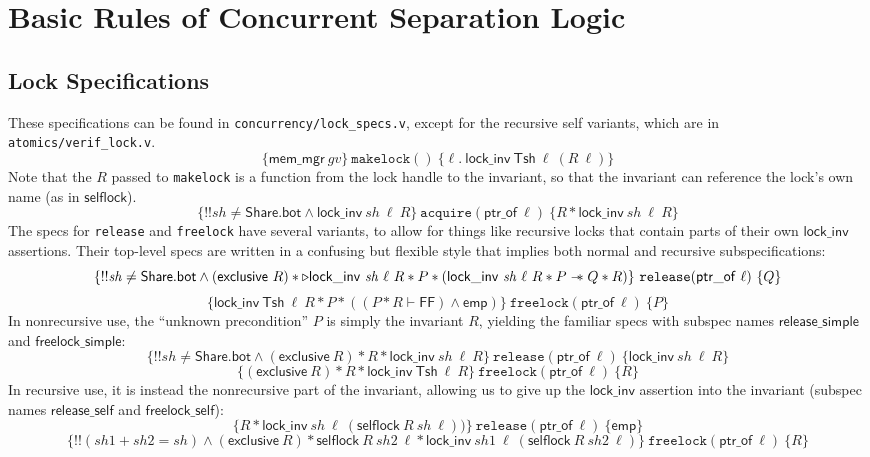 \documentclass[11pt]{article}
\begin{document}
\section{Basic Rules of Concurrent Separation Logic}
\label{CSL}
\subsection{Lock Specifications}
\label{lock-specs}
These specifications can be found in \texttt{concurrency/lock\_specs.v}, except for the recursive \textsf{self} variants, which are in \texttt{atomics/verif\_lock.v}.
$$\{\mathsf{mem\_mgr}\ \mathit{gv}\}\ \texttt{makelock}()\ \{\ell.\ \mathsf{lock\_inv}\ \mathsf{Tsh}\ \ell\ (R\ \ell)\}$$
Note that the $R$ passed to \texttt{makelock} is a function from the lock handle to the invariant, so that the invariant can reference the lock's own name (as in $\mathsf{selflock}$).
$$\{!!\mathit{sh} \neq \mathsf{Share.bot} \land \mathsf{lock\_inv}\ \mathit{sh}\ \ell\ R\}\ \texttt{acquire}(\mathsf{ptr\_of}\ \ell)\ \{R * \mathsf{lock\_inv}\ \mathit{sh}\ \ell\ R\}$$
The specs for \texttt{release} and \texttt{freelock} have several variants, to allow for things like recursive locks that contain parts of their own $\mathsf{lock\_inv}$ assertions. Their top-level specs are written in a confusing but flexible style that implies both normal and recursive subspecifications:
$$\{!!\mathit{sh} \neq \mathsf{Share.bot} \land (\mathsf{exclusive}\ R) * \triangleright \mathsf{lock\_inv}\ \mathit{sh}\ \ell\ R * P * (\mathsf{lock\_inv}\ \mathit{sh}\ \ell\ R * P \wand Q * R)\}\ \texttt{release}(\mathsf{ptr\_of}\ \ell)\ \{Q\}$$
$$\{\mathsf{lock\_inv}\ \mathsf{Tsh}\ \ell\ R * P * ((P * R \vdash \mathsf{FF}) \land \mathsf{emp})\}\ \texttt{freelock}(\mathsf{ptr\_of}\ \ell)\ \{P\}$$
In nonrecursive use, the ``unknown precondition'' $P$ is simply the invariant $R$, yielding the familiar specs with subspec names $\mathsf{release\_simple}$ and $\mathsf{freelock\_simple}$:
$$\{!!\mathit{sh} \neq \mathsf{Share.bot} \land (\mathsf{exclusive}\ R) * R * \mathsf{lock\_inv}\ \mathit{sh}\ \ell\ R\}\ \texttt{release}(\mathsf{ptr\_of}\ \ell)\ \{\mathsf{lock\_inv}\ \mathit{sh}\ \ell\ R\}$$
$$\{(\mathsf{exclusive}\ R) * R * \mathsf{lock\_inv}\ \mathsf{Tsh}\ \ell\ R\}\ \texttt{freelock}(\mathsf{ptr\_of}\ \ell)\ \{R\}$$
In recursive use, it is instead the nonrecursive part of the invariant, allowing us to give up the $\mathsf{lock\_inv}$ assertion into the invariant (subspec names $\mathsf{release\_self}$ and $\mathsf{freelock\_self}$):
$$\{R * \mathsf{lock\_inv}\ \mathit{sh}\ \ell\ (\mathsf{selflock}\ R\ \mathit{sh}\ \ell))\}\ \texttt{release}(\mathsf{ptr\_of}\ \ell)\ \{\mathsf{emp}\}$$
$$\{!!(\mathit{sh1} + \mathit{sh2} = \mathit{sh}) \land (\mathsf{exclusive}\ R) * \mathsf{selflock}\ R\ \mathit{sh2}\ \ell * \mathsf{lock\_inv}\ \mathit{sh1}\ \ell\ (\mathsf{selflock}\ R\ \mathit{sh2}\ \ell)\}\ \texttt{freelock}(\mathsf{ptr\_of}\ \ell)\ \{R\}$$
 
\end{document}
